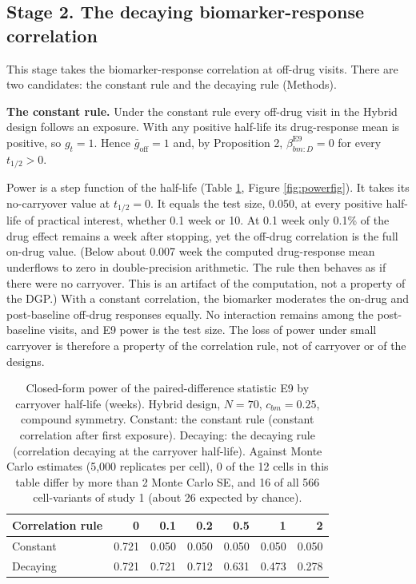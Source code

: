 \documentclass[
  11pt,
]{article}
\begin{document}
\subsection{Stage 2. The decaying biomarker-response correlation}\label{stage-2.-the-decaying-biomarker-response-correlation}

This stage takes the biomarker-response correlation at off-drug
visits. There are two candidates: the constant rule and the decaying
rule (Methods).

\textbf{The constant rule.} Under the constant rule every off-drug visit in
the Hybrid design follows an exposure. With any positive half-life its
drug-response mean is positive, so \(g_t = 1\). Hence
\(\bar g_{\text{off}} = 1\) and, by Proposition 2,
\(\beta_{bm:D}^{\text{E9}} = 0\) for every \(t_{1/2} > 0\).

Power is a step function of the half-life (Table
\ref{tab:closedform}, Figure \ref{fig:powerfig}). It takes its
no-carryover value at \(t_{1/2} = 0\). It equals the test size, 0.050,
at every positive half-life of practical interest, whether 0.1 week
or 10. At 0.1 week only 0.1\% of the drug effect remains a week after
stopping, yet the off-drug correlation is the full on-drug value.
(Below about 0.007 week the computed drug-response mean underflows to
zero in double-precision arithmetic. The rule then behaves as if
there were no carryover. This is an artifact of the computation, not a
property of the DGP.) With a constant correlation, the biomarker
moderates the on-drug and post-baseline off-drug responses equally. No
interaction remains among the post-baseline visits, and E9 power is
the test size. The loss of power under small carryover is therefore a
property of the correlation rule, not of carryover or of the designs.

\begin{table}

\caption{\label{tab:closedform}Closed-form power of the paired-difference statistic E9 by carryover half-life (weeks). Hybrid design, $N = 70$, $c_{bm} = 0.25$, compound symmetry. Constant: the constant rule (constant correlation after first exposure). Decaying: the decaying rule (correlation decaying at the carryover half-life). Against Monte Carlo estimates (5,000 replicates per cell), 0 of the 12 cells in this table differ by more than 2 Monte Carlo SE, and 16 of all 566 cell-variants of study 1 (about 26 expected by chance).}
\centering
\begin{tabular}[t]{lrrrrrr}
\toprule
Correlation rule & 0 & 0.1 & 0.2 & 0.5 & 1 & 2\\
\midrule
Constant & 0.721 & 0.050 & 0.050 & 0.050 & 0.050 & 0.050\\
Decaying & 0.721 & 0.721 & 0.712 & 0.631 & 0.473 & 0.278\\
\bottomrule
\end{tabular}
\end{table}
\end{document}
